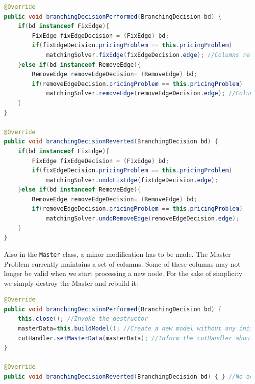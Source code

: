 \documentclass[a4paper]{article}
\newenvironment{myblock}[1]{%
    \tcolorbox[beamer,%
    noparskip,breakable,
    colback=lightBlueCodeBlock,colframe=darkBlueCodeBlock,%
    colbacklower=darkBlueCodeBlock!75!lightBlueCodeBlock,%
    coltitle=blueTitleCodeBlock,
    title=#1]}%
    {\endtcolorbox}
\newcommand{\code}[1]{\lstinline[language=java, style=seminar]!#1!}
\begin{document}
\begin{myblock}{ExactPricingProblemSolver continued}
\begin{lstlisting}[language=java, style=eclipseArticle, xleftmargin=2em]  
@Override
public void branchingDecisionPerformed(BranchingDecision bd) {
	if(bd instanceof FixEdge){
		FixEdge fixEdgeDecision = (FixEdge) bd;
		if(fixEdgeDecision.pricingProblem == this.pricingProblem)
			matchingSolver.fixEdge(fixEdgeDecision.edge); //Columns returned must contains this edge.
	}else if(bd instanceof RemoveEdge){
		RemoveEdge removeEdgeDecision= (RemoveEdge) bd;
		if(removeEdgeDecision.pricingProblem == this.pricingProblem)
			matchingSolver.removeEdge(removeEdgeDecision.edge); //Columns returned CANNOT contain this edge.
	}
}

@Override
public void branchingDecisionReverted(BranchingDecision bd) {
	if(bd instanceof FixEdge){
		FixEdge fixEdgeDecision = (FixEdge) bd;
		if(fixEdgeDecision.pricingProblem == this.pricingProblem)
			matchingSolver.undoFixEdge(fixEdgeDecision.edge);
	}else if(bd instanceof RemoveEdge){
		RemoveEdge removeEdgeDecision= (RemoveEdge) bd;
		if(removeEdgeDecision.pricingProblem == this.pricingProblem)
			matchingSolver.undoRemoveEdge(removeEdgeDecision.edge);
	}
}
\end{lstlisting}
\end{myblock}
Also in the \code{Master} class, a minor modification has to be made. The Master Problem currently maintains a set of columns. Some of these columns may not longer be valid when we start processing a new node. For the sake of simplicity we simply destroy the Master and rebuild it:
\begin{myblock}{Master continued}
\begin{lstlisting}[language=java, style=eclipseArticle, xleftmargin=2em]  
@Override
public void branchingDecisionPerformed(BranchingDecision bd) {
	this.close(); //Invoke the destructor
	masterData=this.buildModel(); //Create a new model without any initialColumns
	cutHandler.setMasterData(masterData); //Inform the cutHandler about the new master model
}

@Override
public void branchingDecisionReverted(BranchingDecision bd) { } //No action required
\end{lstlisting}
\end{myblock}
\end{document}

